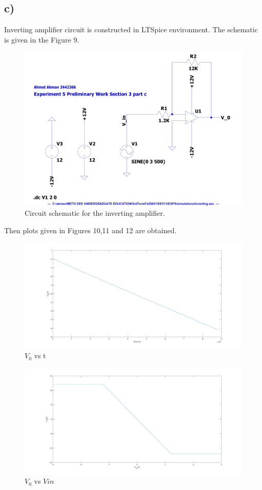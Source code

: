 \documentclass[letterpaper,12pt]{article}
\begin{document}
\subsection{c)}
Inverting amplifier circuit is constructed in LTSpice environment. The schematic is given in the Figure 9.
\begin{figure}[H]
	\centering
   \includegraphics[width=1\textwidth]{Inverting_SCH.pdf}
   \caption{Circuit schematic for the inverting amplifier.}
\end{figure} 
Then plots given in Figures 10,11 and 12 are obtained.
\begin{figure}[H]
	\centering
   \includegraphics[width=1\textwidth]{3c_vs_t.png}
   \caption{\(V_0\) vs t}
\end{figure}

\begin{figure}[H]
	\centering
   \includegraphics[width=1\textwidth]{3c_vs_vin.png}
   \caption{\(V_0\) vs \(V{in}\)}
\end{figure}
\end{document}
